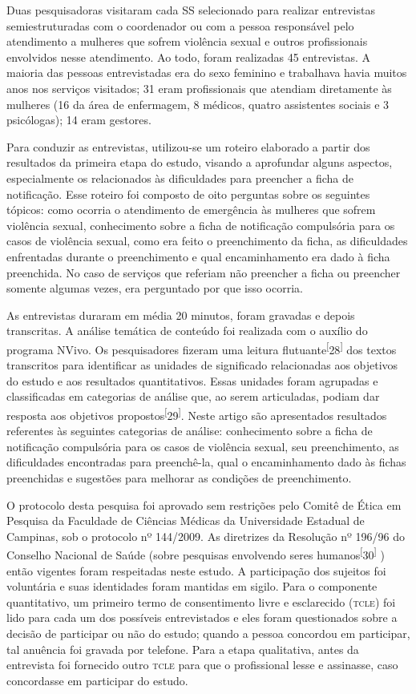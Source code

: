 \documentclass{article}
\begin{document}
Duas pesquisadoras visitaram cada SS selecionado para realizar entrevistas
semiestruturadas com o coordenador ou com a pessoa responsável pelo atendimento
a mulheres que sofrem violência sexual e outros profissionais envolvidos nesse
atendimento. Ao todo, foram realizadas 45 entrevistas. A maioria das pessoas
entrevistadas era do sexo feminino e trabalhava havia muitos anos nos serviços
visitados; 31 eram profissionais que atendiam diretamente às mulheres (16 da
área de enfermagem, 8 médicos, quatro assistentes sociais e 3 psicólogas); 14
eram gestores.

Para conduzir as entrevistas, utilizou-se um roteiro elaborado a partir dos
resultados da primeira etapa do estudo, visando a aprofundar alguns aspectos,
especialmente os relacionados às dificuldades para preencher a ficha de
notificação. Esse roteiro foi composto de oito perguntas sobre os seguintes
tópicos: como ocorria o atendimento de emergência às mulheres que sofrem
violência sexual, conhecimento sobre a ficha de notificação compulsória para os
casos de violência sexual, como era feito o preenchimento da ficha, as
dificuldades enfrentadas durante o preenchimento e qual encaminhamento era dado
à ficha preenchida. No caso de serviços que referiam não preencher a ficha ou
preencher somente algumas vezes, era perguntado por que isso ocorria.

As entrevistas duraram em média 20 minutos, foram gravadas e depois transcritas.
A análise temática de conteúdo foi realizada com o auxílio do programa NVivo. Os
pesquisadores fizeram uma leitura flutuante\textsuperscript{[}28\textsuperscript{]}
dos textos transcritos para identificar as unidades de significado relacionadas
aos objetivos do estudo e aos resultados quantitativos. Essas unidades foram
agrupadas e classificadas em categorias de análise que, ao serem articuladas,
podiam dar resposta aos objetivos
propostos\textsuperscript{[}29\textsuperscript{]}. Neste artigo são apresentados resultados referentes às seguintes categorias de
análise: conhecimento sobre a ficha de notificação compulsória para os casos de
violência sexual, seu preenchimento, as dificuldades encontradas para
preenchê-la, qual o encaminhamento dado às fichas preenchidas e sugestões para
melhorar as condições de preenchimento.

O protocolo desta pesquisa foi aprovado sem restrições pelo Comitê de Ética em
Pesquisa da Faculdade de Ciências Médicas da Universidade Estadual de Campinas,
sob o protocolo nº 144/2009. As diretrizes da Resolução nº 196/96 do Conselho
Nacional de Saúde (sobre pesquisas envolvendo seres
humanos\textsuperscript{[}30\textsuperscript{]}
) então vigentes foram respeitadas neste estudo. A participação dos sujeitos foi
voluntária e suas identidades foram mantidas em sigilo. Para o componente
quantitativo, um primeiro termo de consentimento livre e esclarecido (\textsc{tcle}) foi
lido para cada um dos possíveis entrevistados e eles foram questionados sobre a
decisão de participar ou não do estudo; quando a pessoa concordou em participar,
tal anuência foi gravada por telefone. Para a etapa qualitativa, antes da
entrevista foi fornecido outro \textsc{tcle} para que o profissional lesse e assinasse,
caso concordasse em participar do estudo.
\end{document}

